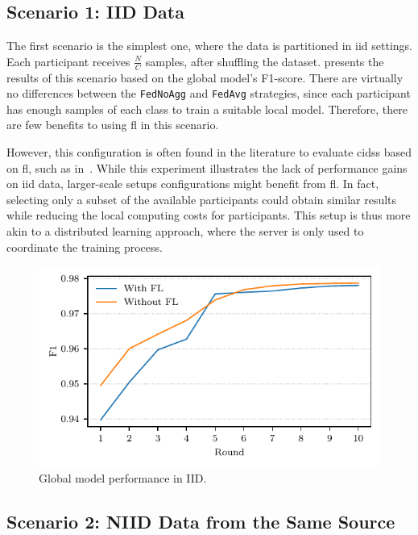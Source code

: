 \subsection{Scenario 1: IID Data\label{sec:demo.iid}}

The first scenario is the simplest one, where the data is partitioned in \gls{iid} settings.
Each participant receives $\frac{N}{C}$ samples, after shuffling the dataset.
 presents the results of this scenario based on the global model's F1-score. 
There are virtually no differences between the \texttt{FedNoAgg} and \texttt{FedAvg} strategies, since each participant has enough samples of each class to train a suitable local model.
Therefore, there are few benefits to using \gls{fl} in this scenario.

However, this configuration is often found in the literature to evaluate \glspl{cids} based on \gls{fl}, such as in~\cite{aouedi_IntrusiondetectionSoftwarized_2022}. %
While this experiment illustrates the lack of performance gains on \gls{iid} data, larger-scale setups configurations might benefit from \gls{fl}.
In fact, selecting only a subset of the available participants could obtain similar results while reducing the local computing costs for participants.
This setup is thus more akin to a distributed learning approach, where the server is only used to coordinate the training process.

\begin{figure}
    \centering
    \includegraphics{figures/iid.pdf}
    \caption{Global model performance in IID.}
    \label{fig:iid}
\end{figure}


\subsection{Scenario 2: NIID Data from the Same Source\label{sec:demo.niid}}

